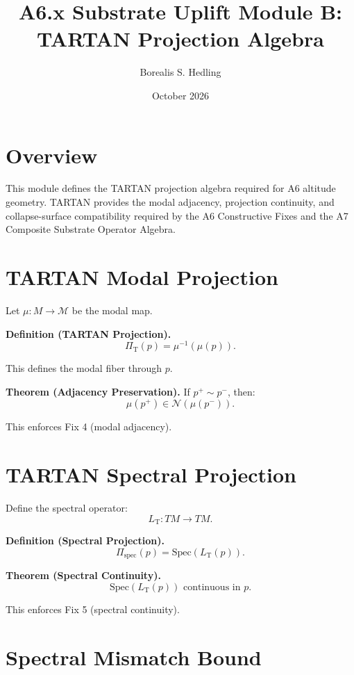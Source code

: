 \documentclass[11pt]{article}
\title{A6.x Substrate Uplift Module B: TARTAN Projection Algebra}
\author{Borealis S. Hedling}
\date{October 2026}
\begin{document}
\maketitle

\section*{Overview}

This module defines the TARTAN projection algebra required for A6 altitude
geometry. TARTAN provides the modal adjacency, projection continuity, and
collapse-surface compatibility required by the A6 Constructive Fixes and the
A7 Composite Substrate Operator Algebra.

\section{TARTAN Modal Projection}

Let $\mu : M \to \mathcal{M}$ be the modal map.

\textbf{Definition (TARTAN Projection).}
\[
\Pi_{\mathrm{T}}(p) = \mu^{-1}(\mu(p)).
\]

This defines the modal fiber through $p$.

\textbf{Theorem (Adjacency Preservation).}
If $p^+ \sim p^-$, then:
\[
\mu(p^+) \in \mathcal{N}(\mu(p^-)).
\]

This enforces Fix 4 (modal adjacency).

\section{TARTAN Spectral Projection}

Define the spectral operator:
\[
L_{\mathrm{T}} : TM \to TM.
\]

\textbf{Definition (Spectral Projection).}
\[
\Pi_{\mathrm{spec}}(p) = \mathrm{Spec}(L_{\mathrm{T}}(p)).
\]

\textbf{Theorem (Spectral Continuity).}
\[
\mathrm{Spec}(L_{\mathrm{T}}(p)) \text{ continuous in } p.
\]

This enforces Fix 5 (spectral continuity).

\section{Spectral Mismatch Bound}
\end{document}
